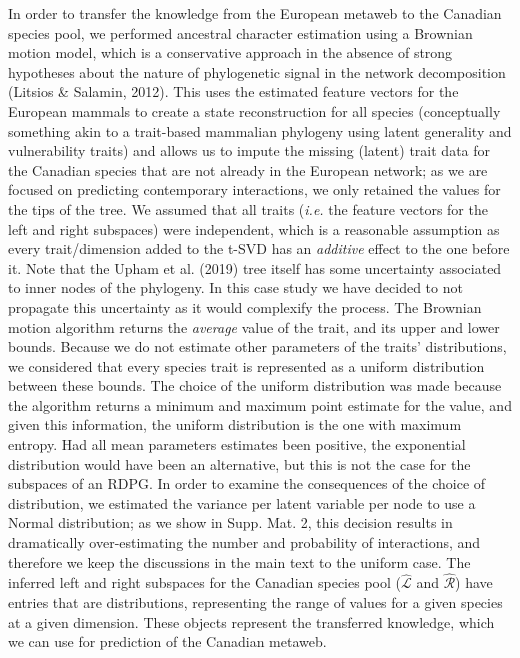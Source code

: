 \documentclass[10pt,oneside]{article}
\begin{document}
In order to transfer the knowledge from the European metaweb to the
Canadian species pool, we performed ancestral character estimation using
a Brownian motion model, which is a conservative approach in the absence
of strong hypotheses about the nature of phylogenetic signal in the
network decomposition (Litsios \& Salamin, 2012). This uses the
estimated feature vectors for the European mammals to create a state
reconstruction for all species (conceptually something akin to a
trait-based mammalian phylogeny using latent generality and
vulnerability traits) and allows us to impute the missing (latent) trait
data for the Canadian species that are not already in the European
network; as we are focused on predicting contemporary interactions, we
only retained the values for the tips of the tree. We assumed that all
traits (\emph{i.e.} the feature vectors for the left and right
subspaces) were independent, which is a reasonable assumption as every
trait/dimension added to the t-SVD has an \emph{additive} effect to the
one before it. Note that the Upham et al. (2019) tree itself has some
uncertainty associated to inner nodes of the phylogeny. In this case
study we have decided to not propagate this uncertainty as it would
complexify the process. The Brownian motion algorithm returns the
\emph{average} value of the trait, and its upper and lower bounds.
Because we do not estimate other parameters of the traits'
distributions, we considered that every species trait is represented as
a uniform distribution between these bounds. The choice of the uniform
distribution was made because the algorithm returns a minimum and
maximum point estimate for the value, and given this information, the
uniform distribution is the one with maximum entropy. Had all mean
parameters estimates been positive, the exponential distribution would
have been an alternative, but this is not the case for the subspaces of
an RDPG. In order to examine the consequences of the choice of
distribution, we estimated the variance per latent variable per node to
use a Normal distribution; as we show in Supp. Mat. 2, this decision
results in dramatically over-estimating the number and probability of
interactions, and therefore we keep the discussions in the main text to
the uniform case. The inferred left and right subspaces for the Canadian
species pool (\(\hat{\mathscr{L}}\) and \(\hat{\mathscr{R}}\)) have
entries that are distributions, representing the range of values for a
given species at a given dimension. These objects represent the
transferred knowledge, which we can use for prediction of the Canadian
metaweb.
\end{document}
